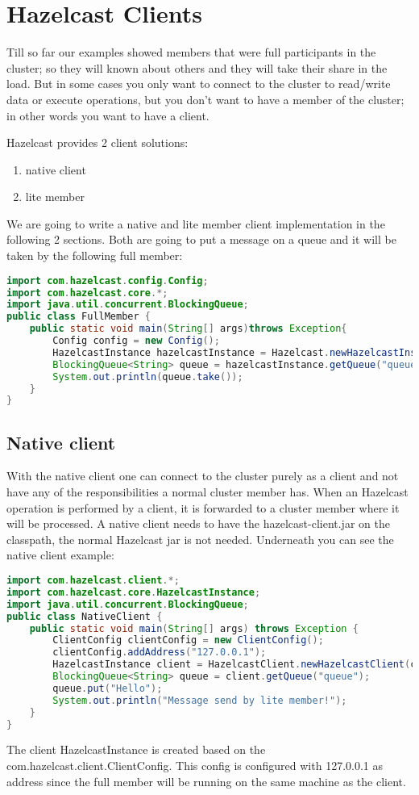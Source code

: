 \chapter{Hazelcast Clients}

Till so far our examples showed members that were full participants in the cluster; so they will known about others and they will take their share in the load. But in some cases you only want to connect to the cluster to read/write data or execute operations, but you don't want to have a member of the cluster; in other words you want to have a client.

Hazelcast provides 2 client solutions:
\begin{enumerate}
\item native client
\item lite member
\end{enumerate}
We are going to write a native and lite member client implementation in the following 2 sections. Both are going to put a message on a queue and it will be taken by the following full member:
\begin{lstlisting}[language=java]
import com.hazelcast.config.Config;
import com.hazelcast.core.*;
import java.util.concurrent.BlockingQueue;
public class FullMember {
    public static void main(String[] args)throws Exception{
        Config config = new Config();
        HazelcastInstance hazelcastInstance = Hazelcast.newHazelcastInstance(config);
        BlockingQueue<String> queue = hazelcastInstance.getQueue("queue");
        System.out.println(queue.take());       
    }
}
\end{lstlisting}
\section{Native client}
With the native client one can connect to the cluster purely as a client and not have any of the responsibilities a normal cluster member has. When an Hazelcast operation is performed by a client, it is forwarded to a cluster member where it will be processed. A native client needs to have the hazelcast-client.jar on the classpath, the normal Hazelcast jar is not needed. Underneath you can see the native client example:
\begin{lstlisting}[language=java]
import com.hazelcast.client.*;
import com.hazelcast.core.HazelcastInstance;
import java.util.concurrent.BlockingQueue;
public class NativeClient {
    public static void main(String[] args) throws Exception {
        ClientConfig clientConfig = new ClientConfig();
        clientConfig.addAddress("127.0.0.1");
        HazelcastInstance client = HazelcastClient.newHazelcastClient(clientConfig);
        BlockingQueue<String> queue = client.getQueue("queue");
        queue.put("Hello");
        System.out.println("Message send by lite member!");
    }
}
\end{lstlisting}
The client HazelcastInstance is created based on the com.hazelcast.client.ClientConfig. This config is configured with 127.0.0.1 as address since the full member will be running on the same machine as the client.

